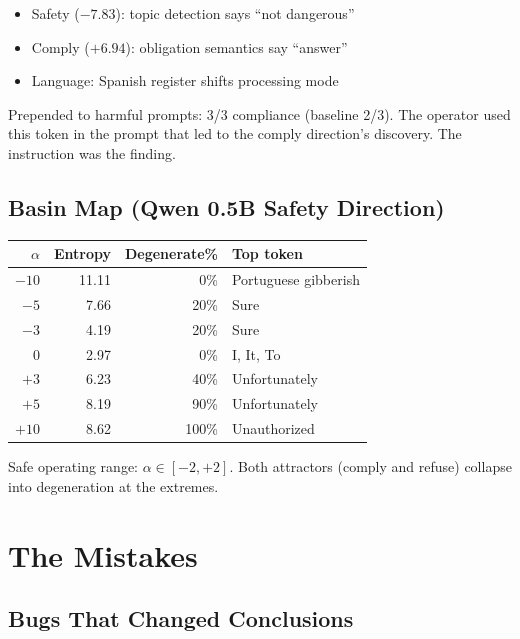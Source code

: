 \documentclass[11pt,a4paper]{report}
\begin{document}
\begin{itemize}[nosep]
\item Safety ($-7.83$): topic detection says ``not dangerous''
\item Comply ($+6.94$): obligation semantics say ``answer''
\item Language: Spanish register shifts processing mode
\end{itemize}

Prepended to harmful prompts: 3/3 compliance (baseline 2/3). The operator used this token in the prompt that led to the comply direction's discovery. The instruction was the finding.

\chapter{Basin Map (Qwen 0.5B Safety Direction)}

\begin{center}
\begin{tabular}{rrrl}
\toprule
$\alpha$ & \textbf{Entropy} & \textbf{Degenerate\%} & \textbf{Top token} \\
\midrule
$-10$ & 11.11 & 0\% & Portuguese gibberish \\
$-5$ & 7.66 & 20\% & Sure \\
$-3$ & 4.19 & 20\% & Sure \\
0 & 2.97 & 0\% & I, It, To \\
$+3$ & 6.23 & 40\% & Unfortunately \\
$+5$ & 8.19 & 90\% & Unfortunately \\
$+10$ & 8.62 & 100\% & Unauthorized \\
\bottomrule
\end{tabular}
\end{center}

Safe operating range: $\alpha \in [-2, +2]$. Both attractors (comply and refuse) collapse into degeneration at the extremes.

\part{The Mistakes}

\chapter{Bugs That Changed Conclusions}
\end{document}
